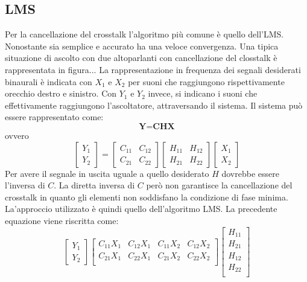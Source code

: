 \documentclass[12pt,a4paper,titlepage]{article}
\begin{document}
\subsection{LMS}
\label{subsec:LMS_teoria}
Per la cancellazione del crosstalk l'algoritmo più comune è quello dell'LMS.
Nonostante sia semplice e accurato ha una veloce convergenza.
Una tipica situazione di ascolto con due altoparlanti con cancellazione del closstalk è rappresentata in figura...
La rappresentazione in frequenza dei segnali desiderati binaurali è indicata con $X_1$ e $X_2$ per suoni che raggiungono rispettivamente orecchio destro e sinistro.
Con $Y_1$ e $Y_2$ invece, si indicano i suoni che effettivamente raggiungono l'ascoltatore, attraversando il sistema.
Il sistema può essere rappresentato come:
\begin{equation}
\textbf{Y=CHX}
\end{equation}
ovvero
\begin{equation}
\begin{bmatrix}
Y_1\\
Y_2
\end{bmatrix}
=
\begin{bmatrix}
C_{11} & C_{12}\\
C_{21} & C_{22}
\end{bmatrix}
\begin{bmatrix}
H_{11} & H_{12}\\
H_{21} & H_{22}
\end{bmatrix}
\begin{bmatrix}
X_1\\
X_2
\end{bmatrix}
\end{equation}
Per avere il segnale in uscita uguale a quello desiderato $H$ dovrebbe essere l'inversa di $C$. La diretta inversa di $C$ però non garantisce la cancellazione del crosstalk in quanto gli elementi non soddisfano la condizione di fase minima.
La'approccio utilizzato è quindi quello dell'algoritmo LMS.
La precedente equazione viene riscritta come:
\begin{equation}
\begin{bmatrix}
Y_1\\
Y_2
\end{bmatrix}
\begin{bmatrix}
C_{11} X_1 & C_{12} X_1 & C_{11} X_2 & C_{12} X_2 \\ 
C_{21} X_1 & C_{22} X_1 & C_{21} X_2 & C_{22} X_2 \\ 
\end{bmatrix}
\begin{bmatrix}
H_{11}\\
H_{21}\\
H_{12}\\
H_{22}\\
\end{bmatrix}
\end{equation}
\end{document}
